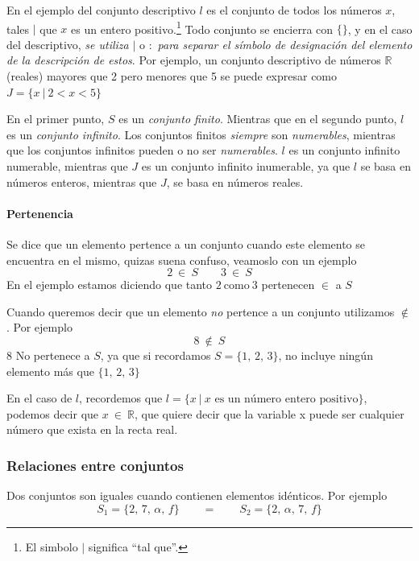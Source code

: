 En el ejemplo del conjunto descriptivo \(l\) es el conjunto de todos los números \(x\), tales \(|\) que \(x\) es un entero positivo.\footnote{El simbolo \(|\) significa ``tal que''.}
Todo conjunto se encierra con \(\{ \}\), y en el caso del descriptivo, \textit{se utiliza} \(|\) o \(:\) \textit{para separar el símbolo de designación
del elemento de la descripción de estos}. Por ejemplo, un conjunto descriptivo de números \(\mathbb{R}\) (reales) mayores que 2 pero menores que 5
se puede expresar como \(J = \{ x ~|~ 2 < x < 5 \}\)

En el primer punto, \(S\) es un \emph{conjunto finito}. Mientras que en el segundo punto, \(l\) es un \emph{conjunto infinito}.
Los conjuntos finitos \textit{siempre} son \emph{numerables}, mientras que los conjuntos infinitos pueden o no ser \emph{numerables}.
\(l\) es un conjunto infinito numerable, mientras que \(J\) es un conjunto infinito inumerable, ya que \(l\) se basa en números
enteros, mientras que \(J\), se basa en números reales.

\paragraph{Pertenencia \in }

Se dice que un elemento pertence a un conjunto cuando este elemento se encuentra en el mismo, quizas suena confuso, veamoslo con un ejemplo
\[
2 ~ \in ~ S \qquad 3 ~ \in ~ S
\]
En el ejemplo estamos diciendo que tanto \(2 ~\text{como}~ 3\) pertenecen \(\in\) a \(S\)

Cuando queremos decir que un elemento \textit{no} pertence a un conjunto utilizamos \(\notin\). Por ejemplo
\[
8 ~ \notin ~ S
\]
\(8\) No pertenece a \(S\), ya que si recordamos \(S = \{ 1,\, 2,\, 3 \}\), no incluye ningún elemento más que \(\{ 1,\, 2,\, 3\}\)

En el caso de \(l\), recordemos que \(l = \{ x ~|~ x\text{ es un número entero positivo} \}\), podemos decir que \(x ~ \in ~ \mathbb{R} \), que quiere
decir que la variable x puede ser cualquier número que exista en la recta real.


\subsubsection{Relaciones entre conjuntos}

Dos conjuntos son iguales cuando contienen elementos idénticos. Por ejemplo 
\[
S_1 = \{2 ,\,  7 ,\,  \alpha ,\,  f\} \qquad = \qquad S_2 = \{2 ,\,  \alpha ,\,  7 ,\,  f\}
\]

